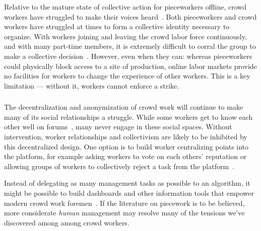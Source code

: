 \documentclass[trackingWork]{subfiles}
\begin{document}
Relative to the mature state of collective action for pieceworkers offline, crowd workers have struggled to make their voices heard~\cite{dynamo,storiesIraniSilberman,turkopticon}.
Both pieceworkers and crowd workers have struggled at times to form a collective identity necessary to organize.
With workers joining and leaving the crowd labor force continuously, and with many part-time members, it is extremely difficult to corral the group to make a collective decision~\cite{dynamo}.
However, even when they can: whereas pieceworkers could physically block access to a site of production, online labor markets provide no facilities for workers to change the experience of other workers.
This is a key limitation --- without it, workers cannot enforce a strike.


\onlyinsubfile{\clearpage}
\subsubsection{\implication}


The decentralization and anonymization of crowd work will continue to make many of its social relationships a struggle.
While some workers get to know each other well on forums~\cite{martin2014being,crowdcollab}, many never engage in these social spaces.
Without intervention, worker relationships and collectivism are likely to be inhibited by this decentralized design.
One option is to build worker centralizing points into the platform, for example asking workers to vote on each others' reputation or allowing groups of workers to collectively reject a task from the platform~\cite{crowdguilds}.

Instead of delegating as many management tasks as possible to an algorithm, it might be possible to build dashboards and other information tools that empower modern crowd work foremen~\cite{kulkarni2012mobileworks}.
If the literature on piecework is to be believed,
more considerate \textit{human} management may resolve
many of the tensions we've discovered among among crowd workers.
\end{document}
